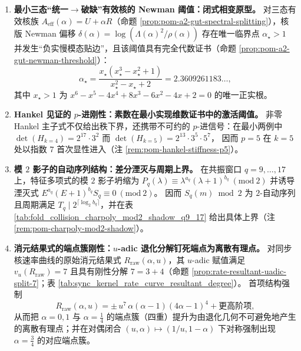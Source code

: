 \begin{enumerate}
  \item \textbf{最小三态“统一$\to$破缺”有效核的 Newman 阈值：闭式相变原型。}
  对三态有效核族 \(A_{\mathrm{eff}}(\alpha)=U+\alpha R\)（命题 \ref{prop:pom-a2-gut-spectral-splitting}），核版 Newman 偏移 \(\delta(\alpha)=\log(\Lambda(\alpha)^2/\rho(\alpha))\) 存在唯一临界点 \(\alpha_\star>1\) 并发生“负实慢模态贴边”，且该阈值具有完全代数证书（命题 \ref{prop:pom-a2-gut-newman-threshold}）：
  \[
  \alpha_\star=\frac{x_\star(x_\star^3-x_\star^2+1)}{x_\star^2-x_\star+2}=2.3609261183\ldots,
  \]
  其中 \(x_\star>1\) 为 \(x^6-x^5-4x^4+8x^3-6x^2-4x+2=0\) 的唯一正实根。

  \item \textbf{Hankel 见证的 \texorpdfstring{$p$}{p}-进刚性：素数在最小实现维数证书中的激活阈值。}
  非零 Hankel 主子式不仅给出秩下界，还携带不可约的 \(p\)-进信号：在最小两例中
  \(
  \det(H_{k=4})=2^{17}\cdot 3^2
  \)
  而
  \(
  \det(H_{k=5})=2^{13}\cdot 3^5\cdot 5^7
  \)，
  因而 \(p=5\) 在 \(k=5\) 处以指数 \(7\) 首次显性进入（注 \ref{rem:pom-hankel-stiffness-p5}）。

  \item \textbf{模 \(2\) 影子的自动序列结构：差分湮灭与周期上界。}
  在共振窗口 \(q=9,\dots,17\) 上，特征多项式的模 \(2\) 影子坍缩为
  \(
  P_q(\lambda)\equiv \lambda^{a_q}(\lambda+1)^{b_q}\ (\mathrm{mod}\ 2)
  \)
  并诱导湮灭式 \(E^{a_q}(E+1)^{b_q}S_q\equiv 0\ (\mathrm{mod}\ 2)\)。
  因而 \(S_q(m)\bmod 2\) 为 \(2\)-自动序列且周期满足 \(T_q\mid 2^{\lceil\log_2 b_q\rceil}\)，并在表 \ref{tab:fold_collision_charpoly_mod2_shadow_q9_17} 给出具体上界（注 \ref{rem:pom-charpoly-mod2-shadow}）。

  \item \textbf{消元结果式的端点簇刚性：\texorpdfstring{$u$}{u}-adic 退化分解钉死端点为离散有理点。}
  对同步核速率曲线的原始消元结果式 \(R_{\mathrm{raw}}(\alpha,u)\)，其 \(u\)-adic 赋值满足 \(v_u(R_{\mathrm{raw}})=7\) 且具有刚性分解 \(7=3+4\)（命题 \ref{prop:rate-resultant-uadic-split-7}；表 \ref{tab:sync_kernel_rate_curve_resultant_degree}）。
  首项结构强制
  \[
  R_{\mathrm{raw}}(\alpha,u)=\pm\,u^7\,\alpha(\alpha-1)(4\alpha-1)^4+\text{更高阶项},
  \]
  从而把 \(\alpha=0,1\) 与 \(\alpha=\tfrac14\) 的端点簇（四重）提升为由退化几何不可避免地产生的离散有理点；并在对偶闭合 \((u,\alpha)\mapsto(1/u,1-\alpha)\) 下对称强制出现 \(\alpha=\tfrac34\) 的对应端点簇。
\end{enumerate}

